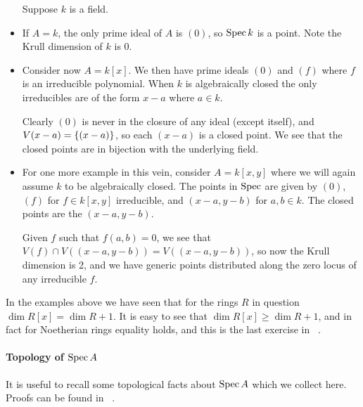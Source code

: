 \documentclass[000-main.tex]{subfiles}
\begin{document}
\begin{example}
  \begin{itemize}
    Suppose $k$ is a field.
    \item If $A = k$, the only prime ideal of $A$ is $(0)$, so $\operatorname{Spec} k$ is a point.
    Note the Krull dimension of $k$ is 0.

    \item Consider now $A = k[x]$.
    We then have prime ideals $(0)$ and $(f)$ where $f$ is an irreducible polynomial.
    When $k$ is algebraically closed the only irreducibles are of the form $x-a$ where $a \in k$.

    Clearly $(0)$ is never in the closure of any ideal (except itself), and $V(x-a) = \qty{(x-a)}$, so each $(x-a)$ is a closed point. %
    We see that the closed points are in bijection with the underlying field.

    \item For one more example in this vein, consider $A = k[x, y]$ where we will again assume $k$ to be algebraically closed.
    The points in $\operatorname{Spec}$ are given by $(0)$, $(f)$ for $f \in k[x, y]$ irreducible, and $(x-a, y-b)$ for $a,b \in k$.
    The closed points are the $(x-a, y-b)$.

    Given $f$ such that $f(a,b)=0$, we see that $V(f) \cap V((x-a, y-b)) = V((x-a, y-b))$, so now the Krull dimension is 2, and we have generic points distributed along the zero locus of any irreducible $f$.
  \end{itemize}
\end{example}

\begin{remark}
  In the examples above we have seen that for the rings $R$ in question $\dim R[x] = \dim R + 1$.
  It is easy to see that $\dim R[x] \geq \dim R + 1$, and in fact for Noetherian rings equality holds, and this is the last exercise in \citeauthor{atiyahIntroductionCommutativeAlgebra2000}~\cite{atiyahIntroductionCommutativeAlgebra2000}.
\end{remark}

\paragraph{Topology of $\operatorname{Spec} A$}

It is useful to recall some topological facts about $\operatorname{Spec} A$ which we collect here.
Proofs can be found in \citeauthor{altmanTermCommutativeAlgebra2013}~\cite[][§13]{altmanTermCommutativeAlgebra2013}.
\end{document}
